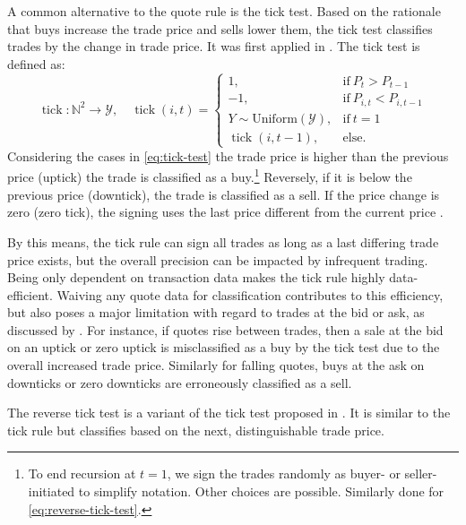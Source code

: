 A common alternative to the quote rule is the tick test. Based on the rationale that buys increase the trade price and sells lower them, the tick test classifies trades by the change in trade price. It was first applied in \textcites[][244]{holthausenEffectLargeBlock1987}[][240]{hasbrouckTradesQuotesInventories1988}. The tick test is defined as:
\begin{equation}
    \operatorname{tick}\colon \mathbb{N}^2 \to \mathcal{Y},\quad
    \operatorname{tick}(i, t)=
    \begin{cases}
        1,                           & \mathrm{if}\ P_{t}>P_{t-1} \\
        -1,                          & \mathrm{if}\ P_{i, t} < P_{i, t-1}  \\
        Y\sim\mathrm{Uniform}(\mathcal{Y}), & \mathrm{if}\ t=1 \\
        \operatorname{tick}(i, t-1), & \mathrm{else}.
    \end{cases}
    \label{eq:tick-test}
\end{equation}
Considering the cases in \cref{eq:tick-test} the trade price is higher than the previous price (uptick) the trade is classified as a buy.\footnote{To end recursion at $t=1$, we sign the trades randomly as buyer- or seller-initiated to simplify notation. Other choices are possible. Similarly done for \cref{eq:reverse-tick-test}.} Reversely, if it is below the previous price (downtick), the trade is classified as a sell. If the price change is zero (zero tick), the signing uses the last price different from the current price \autocite[][735]{leeInferringTradeDirection1991}.

By this means, the tick rule can sign all trades as long as a last differing trade price exists, but the overall precision can be impacted by infrequent trading. Being only dependent on transaction data makes the tick rule highly data-efficient. Waiving any quote data for classification contributes to this efficiency, but also poses a major limitation with regard to trades at the bid or ask, as discussed by \textcite[][557--558]{finucaneDirectTestMethods2000}. For instance, if quotes rise between trades, then a sale at the bid on an uptick or zero uptick is misclassified as a buy by the tick test due to the overall increased trade price. Similarly for falling quotes, buys at the ask on downticks or zero downticks are erroneously classified as a sell.

The reverse tick test is a variant of the tick test proposed in \textcite[][241]{hasbrouckTradesQuotesInventories1988}. It is similar to the tick rule but classifies based on the next, distinguishable trade price.

